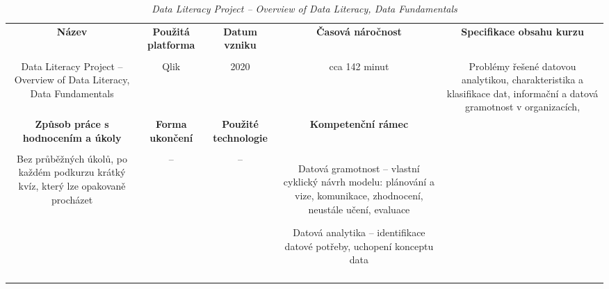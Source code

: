 \begin{landscape}

\begin{table}[htbp]

\renewcommand\thetable{3}

\caption{\textit{Data Literacy Project – Overview of Data Literacy, Data Fundamentals}}\label{tab3}

\footnotesize

{

\justifying

\begin{tabularx}{\linewidth}{CCCCC}

\toprule

\textbf{Název} &

\textbf{Použitá platforma} &

\textbf{Datum vzniku} &

\textbf{Časová náročnost} &
 
\textbf{Specifikace obsahu kurzu}

\\

\tabularnewline
\midrule

Data Literacy Project – Overview of Data Literacy, Data Fundamentals

&

Qlik

&

2020

&

cca 142 minut

&

Problémy řešené datovou analytikou, charakteristika a klasifikace dat, informační a datová gramotnost v organizacích, 

\\
\toprule

\textbf{Způsob práce s hodnocením a úkoly} &

\textbf{Forma ukončení} &

\textbf{Použité technologie} &

\textbf{Kompetenční rámec} 

\\

\tabularnewline
\midrule

Bez průběžných úkolů, po každém podkurzu krátký kvíz, který lze opakovaně procházet

&

–

&

–

&

Datová gramotnost – vlastní cyklický návrh modelu: plánování a vize, komunikace, zhodnocení, neustále učení, evaluace

Datová analytika – identifikace datové potřeby, uchopení konceptu data

\\

\tabularnewline
\bottomrule
\end{tabularx}

}

\end{table}

\end{landscape}